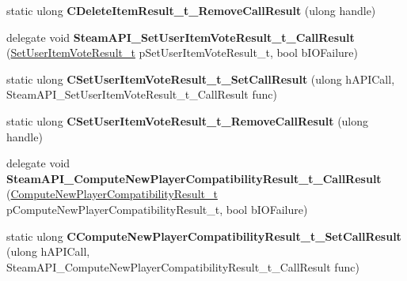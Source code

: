 \begin{DoxyCompactItemize}
static ulong {\bfseries C\+Delete\+Item\+Result\+\_\+t\+\_\+\+Remove\+Call\+Result} (ulong handle)
\item 
\mbox{\label{class_valve_1_1_interop_1_1_native_entrypoints_ab57e922c354a2ad3ced976af76913975}} 
delegate void {\bfseries Steam\+A\+P\+I\+\_\+\+Set\+User\+Item\+Vote\+Result\+\_\+t\+\_\+\+Call\+Result} (\hyperlink{struct_valve_1_1_steamworks_1_1_set_user_item_vote_result__t}{Set\+User\+Item\+Vote\+Result\+\_\+t} p\+Set\+User\+Item\+Vote\+Result\+\_\+t, bool b\+I\+O\+Failure)
\item 
\mbox{\label{class_valve_1_1_interop_1_1_native_entrypoints_a60985a9fa7e2aa3921fbd3f6f9742bd7}} 
static ulong {\bfseries C\+Set\+User\+Item\+Vote\+Result\+\_\+t\+\_\+\+Set\+Call\+Result} (ulong h\+A\+P\+I\+Call, Steam\+A\+P\+I\+\_\+\+Set\+User\+Item\+Vote\+Result\+\_\+t\+\_\+\+Call\+Result func)
\item 
\mbox{\label{class_valve_1_1_interop_1_1_native_entrypoints_ab85a95db5a161546eb0f19aa8e109214}} 
static ulong {\bfseries C\+Set\+User\+Item\+Vote\+Result\+\_\+t\+\_\+\+Remove\+Call\+Result} (ulong handle)
\item 
\mbox{\label{class_valve_1_1_interop_1_1_native_entrypoints_a66005169c0b411b0901c617f6fca2f80}} 
delegate void {\bfseries Steam\+A\+P\+I\+\_\+\+Compute\+New\+Player\+Compatibility\+Result\+\_\+t\+\_\+\+Call\+Result} (\hyperlink{struct_valve_1_1_steamworks_1_1_compute_new_player_compatibility_result__t}{Compute\+New\+Player\+Compatibility\+Result\+\_\+t} p\+Compute\+New\+Player\+Compatibility\+Result\+\_\+t, bool b\+I\+O\+Failure)
\item 
\mbox{\label{class_valve_1_1_interop_1_1_native_entrypoints_a6d67aaa1f7cdbbeb00c8990681ed9b5e}} 
static ulong {\bfseries C\+Compute\+New\+Player\+Compatibility\+Result\+\_\+t\+\_\+\+Set\+Call\+Result} (ulong h\+A\+P\+I\+Call, Steam\+A\+P\+I\+\_\+\+Compute\+New\+Player\+Compatibility\+Result\+\_\+t\+\_\+\+Call\+Result func)
\item 
\mbox{\label{class_valve_1_1_interop_1_1_native_entrypoints_a895caa8e49c16c31e5868efecd1a2926}} 

\end{DoxyCompactItemize}
